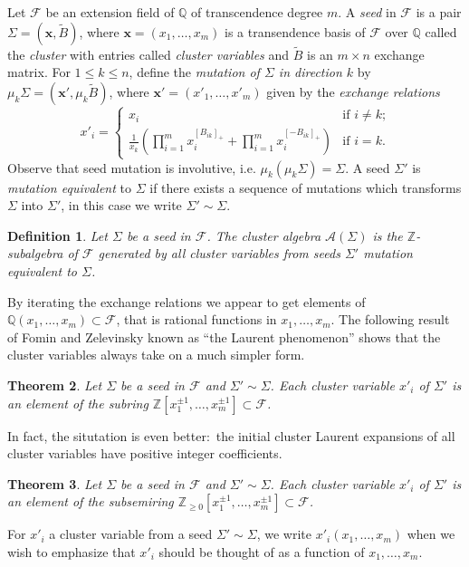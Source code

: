 \documentclass{amsart}
\newtheorem{theorem}{Theorem}[section]
\newtheorem{definition}[theorem]{Definition}
\newcommand{\bfx}{\mathbf{x}}
\newcommand{\cA}{\mathcal{A}}
\newcommand{\cF}{\mathcal{F}}
\newcommand{\QQ}{\mathbb{Q}}
\newcommand{\ZZ}{\mathbb{Z}}
\begin{document}
Let $\cF$ be an extension field of $\QQ$ of transcendence degree $m$.   
A \emph{seed} in $\cF$ is a pair $\Sigma=(\bfx,\tilde B)$, where $\bfx=(x_1,\ldots,x_m)$ is a transendence basis of $\cF$ over $\QQ$ called the \emph{cluster} with entries called \emph{cluster variables} and $\tilde B$ is an $m\times n$ exchange matrix.
For $1\le k\le n$, define the \emph{mutation of $\Sigma$ in direction $k$} by $\mu_k\Sigma=(\bfx',\mu_k\tilde B)$, where $\bfx'=(x'_1,\ldots,x'_m)$ given by the \emph{exchange relations}
\begin{equation}
  \label{eq:exchange relations}
  x'_i=\begin{cases} x_i & \text{if $i\ne k$;}\\ \frac{1}{x_k}\left(\prod\limits_{i=1}^m x_i^{[B_{ik}]_+}+\prod\limits_{i=1}^m x_i^{[-B_{ik}]_+}\right) & \text{if $i=k$.}\end{cases}
\end{equation}
Observe that seed mutation is involutive, i.e. $\mu_k(\mu_k\Sigma)=\Sigma$.
A seed $\Sigma'$ is \emph{mutation equivalent} to $\Sigma$ if there exists a sequence of mutations which transforms $\Sigma$ into $\Sigma'$, in this case we write $\Sigma'\sim\Sigma$.
\begin{definition}
  Let $\Sigma$ be a seed in $\cF$.  The \emph{cluster algebra} $\cA(\Sigma)$ is the $\ZZ$-subalgebra of $\cF$ generated by all cluster variables from seeds $\Sigma'$ mutation equivalent to $\Sigma$.
\end{definition}
By iterating the exchange relations we appear to get elements of $\QQ(x_1,\ldots,x_m)\subset\cF$, that is rational functions in $x_1,\ldots,x_m$.  
The following result of Fomin and Zelevinsky known as ``the Laurent phenomenon'' shows that the cluster variables always take on a much simpler form.
\begin{theorem}\cite{fomin-zelevinsky1}
  Let $\Sigma$ be a seed in $\cF$ and $\Sigma'\sim\Sigma$.  Each cluster variable $x'_i$ of $\Sigma'$ is an element of the subring $\ZZ[x_1^{\pm1},\ldots,x_m^{\pm1}]\subset\cF$.
\end{theorem}

In fact, the situtation is even better:\ the initial cluster Laurent expansions of all cluster variables have positive integer coefficients.
\begin{theorem}\cite{lee-schiffler, gross-hacking-keel-kontsevich}
  Let $\Sigma$ be a seed in $\cF$ and $\Sigma'\sim\Sigma$.  Each cluster variable $x'_i$ of $\Sigma'$ is an element of the subsemiring $\ZZ_{\ge0}[x_1^{\pm1},\ldots,x_m^{\pm1}]\subset\cF$. 
\end{theorem}
For $x'_i$ a cluster variable from a seed $\Sigma'\sim\Sigma$, we write $x'_i(x_1,\ldots,x_m)$ when we wish to emphasize that $x'_i$ should be thought of as a function of $x_1,\ldots,x_m$.
\end{document}
